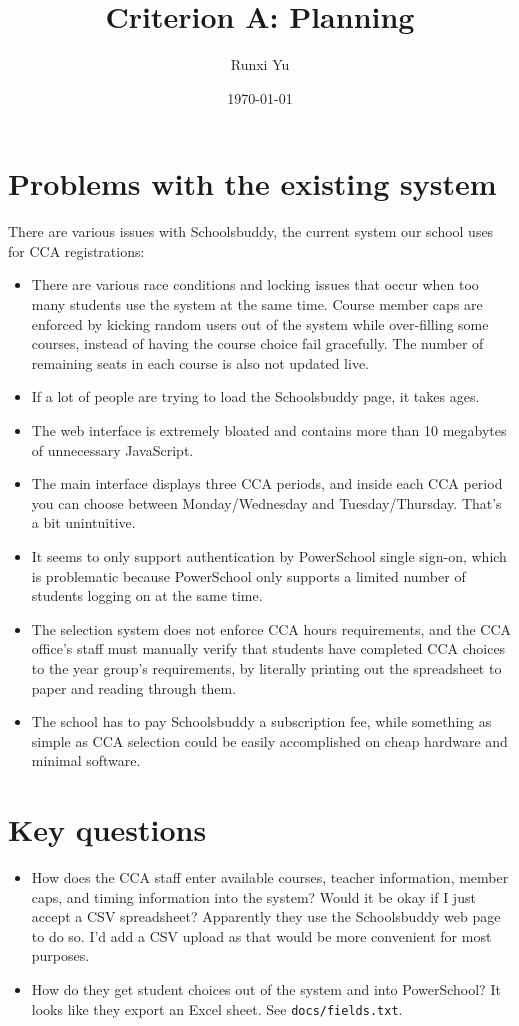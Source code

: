 \documentclass{scrartcl}
\title{Criterion A: Planning}
\author{Runxi Yu}
\date{\today}
\begin{document}
\maketitle

\section{Problems with the existing system}

There are various issues with Schoolsbuddy, the current system our school uses
for CCA registrations:

\begin{itemize}
	\item There are various race conditions and locking issues that occur when too many
		students use the system at the same time. Course member caps are enforced by
		kicking random users out of the system while over-filling some courses,
		instead of having the course choice fail gracefully. The number of remaining
		seats in each course is also not updated live.
	\item If a lot of people are trying to load the Schoolsbuddy page, it takes ages.
	\item The web interface is extremely bloated and contains more than 10 megabytes of
		unnecessary JavaScript.
	\item The main interface displays three CCA periods, and inside each CCA period you
		can choose between Monday/Wednesday and Tuesday/Thursday. That's a bit
		unintuitive.
	\item It seems to only support authentication by PowerSchool single sign-on, which
		is problematic because PowerSchool only supports a limited number of students
		logging on at the same time.
	\item The selection system does not enforce CCA hours requirements, and the CCA
		office's staff must manually verify that students have completed CCA choices
		to the year group's requirements, by literally printing out the spreadsheet
		to paper and reading through them.
	\item The school has to pay Schoolsbuddy a subscription fee, while something as
		simple as CCA selection could be easily accomplished on cheap hardware and
		minimal software.
\end{itemize}

\section{Key questions}

\begin{itemize}
	\item How does the CCA staff enter available courses, teacher information, member
		caps, and timing information into the system? Would it be okay if I just
		accept a CSV spreadsheet?   
		Apparently they use the Schoolsbuddy web page to do so. I'd add a CSV upload
		as that would be more convenient for most purposes.
	\item How do they get student choices out of the system and into PowerSchool?   
		It looks like they export an Excel sheet. See \texttt{docs/fields.txt}.
\end{itemize}
\end{document}
